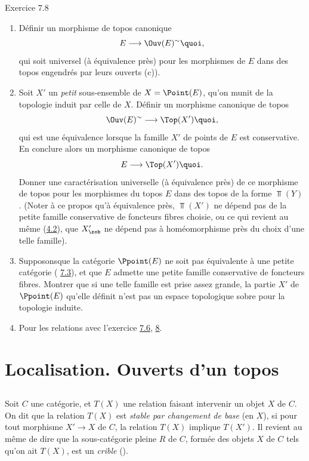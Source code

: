 \begin{enonce*}[remark]{Exercice 7.8}
\begin{enumerate}
\item Définir un morphisme de topos canonique
$$
E\longrightarrow \Ouv(E)^{\sim}{\quoi},
$$
qui soit universel (à équivalence près) pour les morphismes de $E$
dans des topos engendrés par leurs ouverts (\cf c)).

\item Soit $X'$ un \emph{petit} sous-ensemble de $X=\Point(E)$, qu'on
munit de la topologie induit par celle de $X$. Définir un morphisme
canonique de topos
$$
\Ouv(E)^{\sim}\longrightarrow \Top(X'){\quoi},
$$
qui est une équivalence lorsque la famille $X'$ de points de $E$ est
conservative. En conclure alors un morphisme canonique de topos
$$
E\longrightarrow \Top(X'){\quoi}.
$$
Donner une caractérisation universelle (à équivalence près) de ce
morphisme de topos pour les morphismes du topos $E$ dans des topos
de la forme $\Top(Y)$. (Noter à ce propos qu'à équivalence près,
$\Top(X')$ ne dépend pas de la petite famille conservative de
foncteurs fibres choisie, ou ce qui revient au même
(\hyperref[IV.subsec4.2]{4.2}), que $X'_{\sob}$ ne dépend pas à homéomorphisme
près du choix d'une telle famille).

\item Supposons\pageoriginale que la catégorie $\Ppoint(E)$ ne
soit pas équivalente à une petite catégorie (\cf
\hyperref[IV.subsec7.3]{7.3}), et que $E$ admette une petite famille
conservative de foncteurs fibres. Montrer que si une telle famille
est prise assez grande, la partie $X'$ de $\Ppoint(E)$ qu'elle
définit n'est pas un espace topologique sobre pour la topologie
induite.

\item Pour les relations avec l'exercice \hyperref[IV.exer7.6]{7.6}, \cf \hyperref[IV.sec8]{8}.
\end{enumerate}
\end{enonce*}

\section{Localisation. Ouverts d'un topos}

\subsection{}
Soit $C$ une catégorie, et $T(X)$ une relation faisant intervenir un
objet $X$ de $C$. On dit que la relation $T(X)$ est \emph{stable par
changement de base} (en $X$), si pour tout morphisme $X'\rightarrow
X$ de $C$, la relation $T(X)$ implique $T(X')$. Il revient au même
de dire que la sous-catégorie pleine $R$ de $C$, formée des objets
$X$ de $C$ tels qu'on ait $T(X)$, est un \emph{crible}
().

